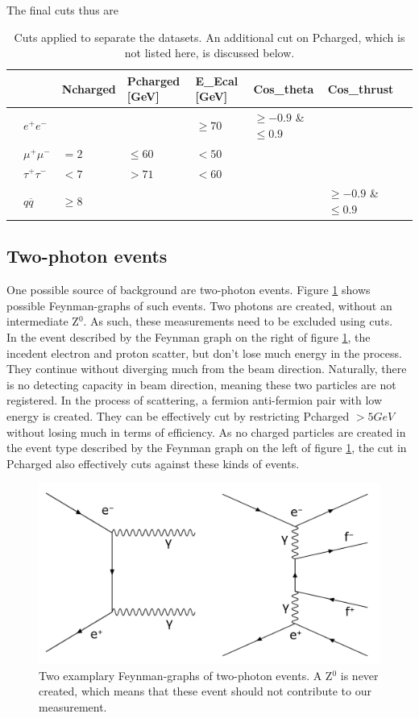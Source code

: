 The final cuts thus are
\begin{table}[H]\centering
	\begin{tabular}{@{}llllllll@{}}
		\toprule
		&			&Ncharged	&Pcharged [GeV]	&E\_Ecal [GeV] &Cos\_theta				&Cos\_thrust\\ 
		\midrule
		&$e^+e^-$	&			&				&$\ge70$		&$\ge-0.9$ \& $\le0.9$	&\\
		&$\mu^+\mu^-$		&$=2$			&$\le60$		&$<50$			&						&\\
		&$\tau^+\tau^-$		&$<7$		&$>71$			&$<60$			&						&\\
		&$q\overline{q}$		&$\ge8$		&				&				&						&$\ge-0.9$ \& $\le0.9$	\\
		\bottomrule
	\end{tabular}
	\caption[Table of cuts]{Cuts applied to separate the datasets. An additional cut on Pcharged, which is not listed here, is discussed below.}
\end{table}

\subsection{Two-photon events}
One possible source of background are two-photon events. Figure \ref{fig:twophotonfeynman} shows possible Feynman-graphs of such events. Two photons are created, without an intermediate Z$^0$. As such, these measurements need to be excluded using cuts.\\
In the event described by the Feynman graph on the right of figure \ref{fig:twophotonfeynman}, the incedent electron and proton scatter, but don't lose much energy in the process. They continue without diverging much from the beam direction. Naturally, there is no detecting capacity in beam direction, meaning these two particles are not registered. In the process of scattering, a fermion anti-fermion pair with low energy is created. They can be effectively cut by restricting Pcharged $> \unit{5}{GeV}$ without losing much in terms of efficiency.
As no charged particles are created in the event type described by the Feynman graph on the left of figure \ref{fig:twophotonfeynman}, the cut in Pcharged also effectively cuts against these kinds of events.
\begin{figure}[H]
\centering
\includegraphics[width=1.0\linewidth]{graphics/twophotonfeynman_both.pdf}
\caption[Two-photon Feynman-graph]{Two examplary Feynman-graphs of two-photon events. A Z$^0$ is never created, which means that these event should not contribute to our measurement.}
\label{fig:twophotonfeynman}
\end{figure}

